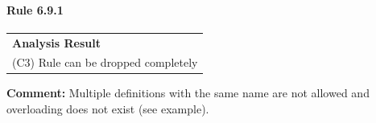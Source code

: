 \paragraph{Rule 6.9.1}
\begin{longtable}{p{13cm}}
\textbf{Analysis Result} \\
(C3) Rule can be dropped completely \\
\end{longtable}
\textbf{Comment:} Multiple definitions with the same name are not allowed and overloading does not exist (see example). \\


